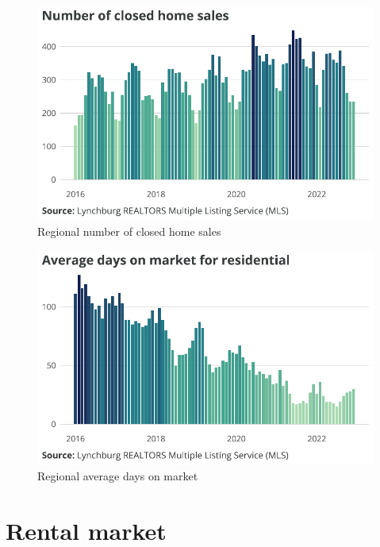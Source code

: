 \documentclass[
  letterpaper,
  DIV=11,
  numbers=noendperiod]{scrreprt}
\begin{document}
\begin{figure}[H]

{\centering \includegraphics{./part-3-1_files/figure-pdf/fig-mls-sales-1.pdf}

}

\caption{\label{fig-mls-sales}Regional number of closed home sales}

\end{figure}

\begin{figure}[H]

{\centering \includegraphics{./part-3-1_files/figure-pdf/fig-mls-dom-1.pdf}

}

\caption{\label{fig-mls-dom}Regional average days on market}

\end{figure}

\hypertarget{rental-market}{%
\section{Rental market}\label{rental-market}}
\end{document}
